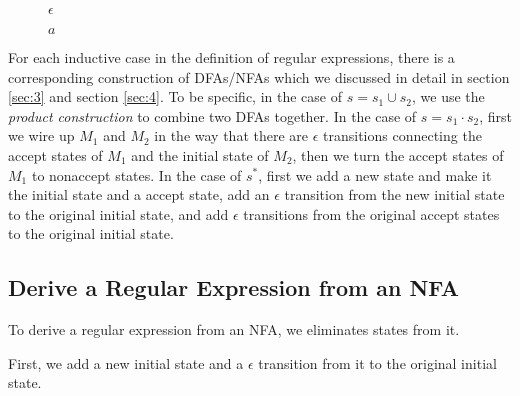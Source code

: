 \documentclass[11pt]{article}
\begin{document}
\begin{figure}[ht]
    \centering
    \caption{$\epsilon$}
    \label{fig:fig21}
\end{figure}

\begin{figure}[ht]
    \centering
    \caption{$a$}
    \label{fig:fig22}
\end{figure}

For each inductive case in the definition of regular expressions, there is
a corresponding construction of DFAs/NFAs which we discussed in detail in
section \ref{sec:3} and section \ref{sec:4}. To be specific, in the case of
$s = s_1 \cup s_2$, we use the \emph{product construction} to combine two
DFAs together. In the case of $s = s_1 \cdot s_2$, first we wire up $M_1$
and $M_2$ in the way that there are $\epsilon$ transitions connecting the
accept states of $M_1$ and the initial state of $M_2$, then we turn the
accept states of $M_1$ to nonaccept states. In the case of $s^\ast$, first
we add a new state and make it the initial state and a accept state, add
an $\epsilon$ transition from the new initial state to the original initial
state, and add $\epsilon$ transitions from the original accept states to
the original initial state.

\subsection{Derive a Regular Expression from an NFA}

To derive a regular expression from an NFA, we eliminates states from it.

First, we add a new initial state and a $\epsilon$ transition from it to
the original initial state.
\end{document}
